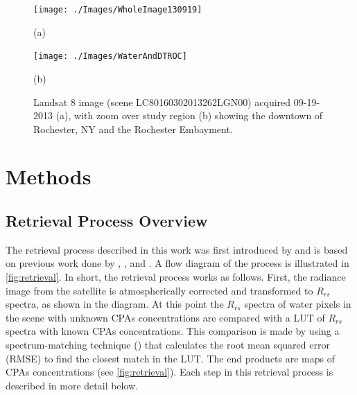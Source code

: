 \documentclass[onecolumn,3p,letterpaper]{elsarticle}
\begin{document}
\begin{figure}[htbp!]
  	\begin{minipage}[c]{0.48\linewidth}
    	\centering
    	\texttt{[image: ./Images/WholeImage130919]}
    	\centerline{(a)}\medskip
  	\end{minipage}
  	\hfill
  	\begin{minipage}[d]{0.48\linewidth}
    	\centering
    	\texttt{[image: ./Images/WaterAndDTROC]}
    	\centerline{(b)}\medskip
    \end{minipage}	

    \caption{Landsat 8 image (scene LC80160302013262LGN00) acquired 09-19-2013 (a), with zoom over study region (b) showing the downtown of Rochester, NY and the Rochester Embayment. \label{fig:L8Image130919} }
\end{figure}

\section{Methods}
\subsection{Retrieval Process Overview}
The retrieval process described in this work was first introduced by \cite*{Concha2013IGARSS} and is based on previous work done by \cite{Raqueno:2000}, \cite{Gerace:2012}, \cite{Pahlevan:2012b} and \cite{Gerace:2013}. A flow diagram of the process is illustrated in \autoref{fig:retrieval}. In short, the retrieval process works as follows. First, the radiance image from the satellite is atmospherically corrected and transformed to $R_{rs}$ spectra, as shown in the diagram. At this point the $R_{rs}$ spectra of water pixels in the scene with unknown CPAs concentrations are compared with a LUT of $R_{rs}$ spectra with known CPAs concentrations. This comparison is made by using a spectrum-matching technique (\cite{Raqueno:2000,Mobley:2005}) that calculates the root mean squared error (RMSE) to find the closest match in the LUT. The end products are maps of CPAs concentrations (see \autoref{fig:retrieval}). Each step in this retrieval process is described in more detail below.
\end{document}
